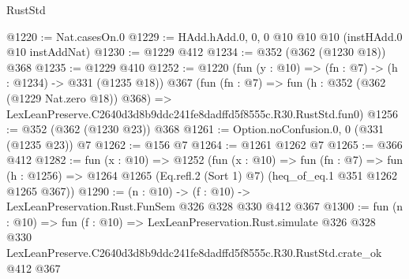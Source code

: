 \begin{lexlean}{RustStd}
\begin{coremodule}
@1220 := Nat.casesOn.{0}
@1229 := HAdd.hAdd.{0, 0, 0} @10 @10 @10 (instHAdd.{0} @10 instAddNat)
@1230 := @1229 @412
@1234 := @352 (@362 (@1230 @18)) @368
@1235 := @1229 @410
@1252 := @1220
    (fun (y : @10) => (fn : @7) -> (h : @1234) -> @331 (@1235 @18))
    @367
    (fun (fn : @7) =>
    fun (h : @352 (@362 (@1229 Nat.zero @18)) @368) =>
    LexLeanPreserve.C2640d3d8b9ddc241fe8dadffd5f8555c.R30.RustStd.fun0)
@1256 := @352 (@362 (@1230 @23)) @368
@1261 := Option.noConfusion.{0, 0} (@331 (@1235 @23)) @7
@1262 := @156 @7
@1264 := @1261 @1262 @7
@1265 := @366 @412
@1282 := fun (x : @10) =>
  @1252
    (fun (x : @10) =>
    fun (fn : @7) =>
    fun (h : @1256) => @1264 @1265 (Eq.refl.{2} (Sort 1) @7) (heq_of_eq.{1} @351 @1262 @1265 @367))
@1290 := (n : @10) -> (f : @10) -> LexLeanPreservation.Rust.FunSem @326 @328 @330 @412 @367
@1300 := fun (n : @10) =>
  fun (f : @10) =>
  LexLeanPreservation.Rust.simulate
    @326
    @328
    @330
    LexLeanPreserve.C2640d3d8b9ddc241fe8dadffd5f8555c.R30.RustStd.crate_ok
    @412
    @367
\end{coremodule}
\end{lexlean}
